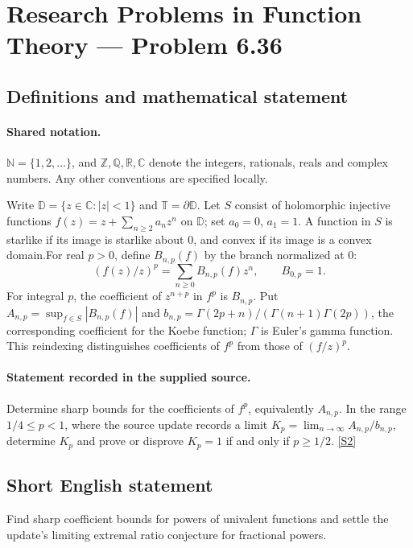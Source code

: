 \documentclass[11pt]{article}
\newcommand{\sref}[2]{\hyperlink{source:#1:#2}{[S#2]}}
\begin{document}
\section{Research Problems in Function Theory — Problem 6.36}\label{statement}

\subsection{Definitions and mathematical statement}

\paragraph{Shared notation.}$\mathbb N=\{1,2,\ldots\}$, and $\mathbb Z,\mathbb Q,\mathbb R,\mathbb C$ denote the integers, rationals, reals and complex numbers. Any other conventions are specified locally.


Write $\mathbb D=\{z\in\mathbb C:|z|<1\}$ and $\mathbb T=\partial\mathbb D$. Let $S$ consist of holomorphic injective functions $f(z)=z+\sum_{n\ge2}a_nz^n$ on $\mathbb D$; set $a_0=0$, $a_1=1$. A function in $S$ is starlike if its image is starlike about $0$, and convex if its image is a convex domain.For real $p>0$, define $B_{n,p}(f)$ by the branch normalized at $0$:
\[(f(z)/z)^p=\sum_{n\ge0}B_{n,p}(f)z^n,\qquad B_{0,p}=1.\]
For integral $p$, the coefficient of $z^{n+p}$ in $f^p$ is $B_{n,p}$. Put $A_{n,p}=\sup_{f\in S}|B_{n,p}(f)|$ and $b_{n,p}=\Gamma(2p+n)/(\Gamma(n+1)\Gamma(2p))$, the corresponding coefficient for the Koebe function; $\Gamma$ is Euler's gamma function. This reindexing distinguishes coefficients of $f^p$ from those of $(f/z)^p$.
\paragraph{Statement recorded in the supplied source.}
Determine sharp bounds for the coefficients of $f^p$, equivalently $A_{n,p}$. In the range $1/4\le p<1$, where the source update records a limit $K_p=\lim_{n\to\infty}A_{n,p}/b_{n,p}$, determine $K_p$ and prove or disprove $K_p=1$ if and only if $p\ge1/2$. \sref{statement}{2}
\subsection{Short English statement}
Find sharp coefficient bounds for powers of univalent functions and settle the update’s limiting extremal ratio conjecture for fractional powers.
\end{document}
